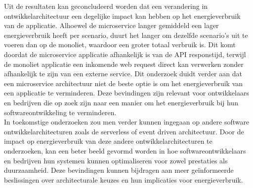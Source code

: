 Uit de resultaten kan geconcludeerd worden dat een verandering in ontwikkelarchitectuur een degelijke impact kan hebben op het energieverbruik van de applicatie. Alhoewel de microservice langer gemiddeld een lager energieverbruik heeft per scenario, duurt het langer om dezelfde scenario's uit te voeren dan op de monoliet, waardoor een groter totaal verbruik is. Dit komt doordat de microservice applicatie afhankelijk is van de API responstijd, terwijl de monoliet applicatie een inkomende web request direct kan verwerken zonder afhankelijk te zijn van een externe service. Dit onderzoek duidt verder aan dat een microservice architectuur niet de beste optie is om het energieverbruik van een applicatie te verminderen. Deze bevindingen zijn relevant voor ontwikkelaars en bedrijven die op zoek zijn naar een manier om  het energieverbruik bij hun softwareontwikkeling te verminderen.\\

In toekomstige onderzoeken zou men verder kunnen ingegaan op andere software ontwikkelarchitecturen zoals de serverless of event driven architectuur. Door de impact op energieverbruik van deze andere ontwikkelarchitecturen te onderzoeken, kan een beter beeld gevormd worden in hoe softwareontwikkelaars en bedrijven hun systemen kunnen optimaliseren voor zowel prestaties als duurzaamheid. Deze bevindingen kunnen bijdragen aan meer geïnformeerde beslissingen over architecturale keuzes en hun implicaties voor energieverbruik.